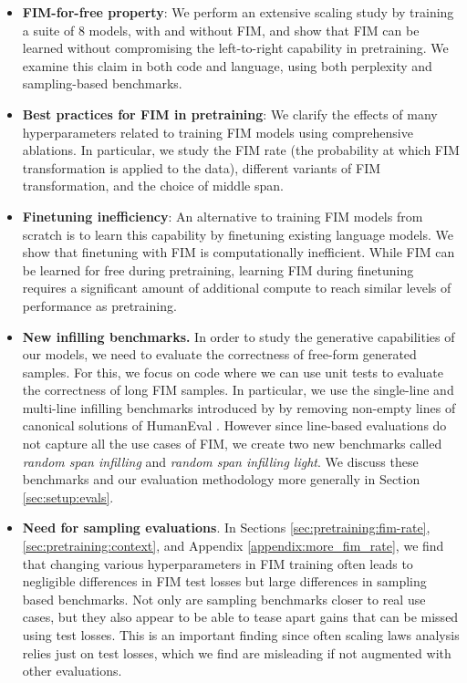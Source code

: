 \documentclass[postscript]{article}
\begin{document}
 \begin{itemize}
     \item \textbf{FIM-for-free property}: We perform an extensive scaling study by training a suite of 8 models, with and without FIM, and show that FIM can be learned without compromising the left-to-right capability in pretraining. We examine this claim in both code and language, using both perplexity and sampling-based benchmarks. 
    \item \textbf{Best practices for FIM in pretraining}: We clarify the effects of many hyperparameters related to training FIM models using comprehensive ablations. In particular, we study the FIM rate (the probability at which FIM transformation is applied to the data), different variants of FIM transformation, and the choice of middle span.
    \item \textbf{Finetuning inefficiency}: An alternative to training FIM models from scratch is to learn this capability by finetuning existing language models. We show that finetuning with FIM is computationally inefficient. While FIM can be learned for free during pretraining, learning FIM during finetuning requires a significant amount of additional compute to reach similar levels of performance as pretraining.
    \item \textbf{New infilling benchmarks.} In order to study the generative capabilities of our models, we need to evaluate the correctness of free-form generated samples. For this, we focus on code where we can use unit tests to evaluate the correctness of long FIM samples. In particular, we use the single-line and multi-line infilling benchmarks introduced by \citep{incoder} by removing non-empty lines of canonical solutions of HumanEval \citep{codex}. However since line-based evaluations do not capture all the use cases of FIM, we create two new benchmarks called \emph{random span infilling} and \emph{random span infilling light}. 
    We discuss these benchmarks and our evaluation methodology more generally in Section \ref{sec:setup:evals}. 
    \item \textbf{Need for sampling evaluations}.  In  Sections \ref{sec:pretraining:fim-rate}, \ref{sec:pretraining:context}, and Appendix \ref{appendix:more_fim_rate}, we find that changing various hyperparameters in FIM training often leads to negligible differences in FIM test losses but large differences in sampling based benchmarks. Not only are sampling benchmarks closer to real use cases, but they also appear to be able to tease apart gains that can be missed using test losses. This is an important finding since often scaling laws analysis relies just on test losses, which we find are misleading if not augmented with other evaluations.
 \end{itemize}
\end{document}
